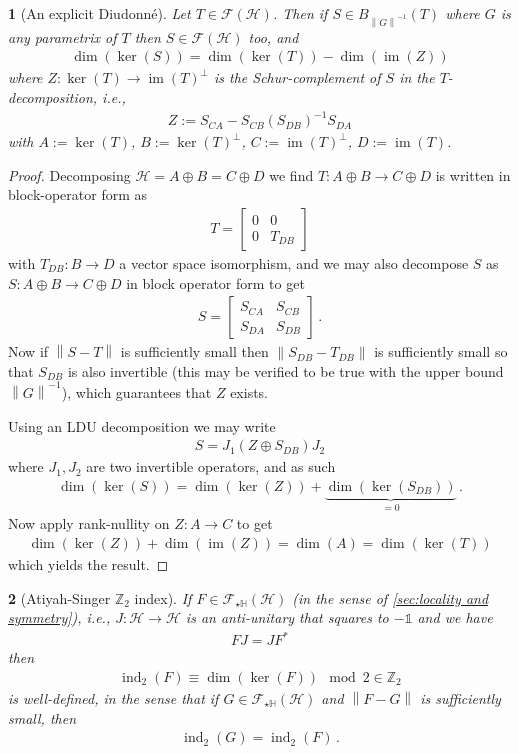 \documentclass[a4paper,10pt]{article}
\numberwithin{equation}{section}
\theoremstyle{plain}
\newtheorem{thm}{\protect\theoremname}[section]
\theoremstyle{plain}
\newtheorem{lem}[thm]{\protect\lemmaname}
\theoremstyle{plain}
\theoremstyle{plain}
\theoremstyle{plain}
\theoremstyle{remark}
\theoremstyle{definition}
\theoremstyle{plain}
\providecommand{\lemmaname}{Lemma}
\providecommand{\theoremname}{Theorem}
\newcommand{\ZZ}{\mathbb{Z}}
\newcommand{\calF}{\mathcal{F}}
\newcommand{\calH}{\mathcal{H}}
\newcommand\norm[1]{\left\lVert#1\right\rVert}
\newcommand{\Id}{\mathds{1}}
\newcommand{\HH}{\mathbb{H}}
\newcommand{\findex}{\operatorname{ind}}
\newcommand{\im}{\operatorname{im}}
\newcommand{\eq}[1]{\begin{align*}#1\end{align*}}
\newcommand{\Schur}{Z}
\begin{document}
	\begin{lem}[An explicit Diudonn\'e]\label{lem:strengthening of Diudonne}
		Let $T\in\mathcal{F}\left(\mathcal{H}\right)$. Then if $S\in B_{\norm{G}^{-1}}\left(T\right)$
		where $G$ is any parametrix of $T$ then $S\in\mathcal{F}\left(\mathcal{H}\right)$
		too, and 
		\eq{
			\dim\left(\ker\left(S\right)\right)=\dim\left(\ker\left(T\right)\right)-\dim\left(\im\left(\Schur\right)\right)
		}
		where $\Schur:\ker\left(T\right)\to\im\left(T\right)^{\perp}$
		is the Schur-complement of $S$ in the $T$-decomposition, i.e., 
		\eq{
			\Schur:=S_{CA}-S_{CB}\left(S_{DB}\right)^{-1}S_{DA}
		}
		with $A:=\ker\left(T\right)$, $B:=\ker\left(T\right)^{\perp}$, $C:=\im\left(T\right)^{\perp}$,
		$D:=\im\left(T\right)$.
	\end{lem}
	
	\begin{proof}
		Decomposing $\mathcal{H}= A\oplus B= C\oplus D$ we find $T:A\oplus B\to C\oplus D$
		is written in block-operator form as 
		\eq{
			T=\begin{bmatrix}0 & 0\\
				0 & T_{DB}
			\end{bmatrix}
		}
		with $T_{DB}:B\to D$ a vector space isomorphism, and we may also
		decompose $S$ as $S:A\oplus B\to C\oplus D$ in block operator form
		to get 
		\eq{
			S = \begin{bmatrix}S_{CA} & S_{CB}\\
				S_{DA} & S_{DB}
			\end{bmatrix}\,.
		}
		Now if $\norm{S-T}$ is sufficiently small then $\norm{S_{DB}-T_{DB}}$
		is sufficiently small so that $S_{DB}$ is also invertible (this may
		be verified to be true with the upper bound $\norm{G}^{-1}$), which guarantees that $\Schur$ exists. 
		
		Using an LDU decomposition we may write 
		\eq{
			S=J_{1}\left(\Schur\oplus S_{DB}\right)J_{2}
		}
		where $J_{1},J_{2}$ are two invertible operators, and as such 
		\eq{
			\dim\left(\ker\left(S\right)\right)  =  \dim\left(\ker\left(\Schur\right)\right)+\underbrace{\dim\left(\ker\left(S_{DB}\right)\right)}_{=0}\,.
		}
		Now apply rank-nullity on $\Schur:A\to C$ to get 
		\eq{
			\dim\left(\ker\left(\Schur\right)\right)+\dim\left(\im\left(\Schur\right)\right)  =  \dim\left(A\right)=\dim\left(\ker\left(T\right)\right)
		}
		which yields the result.
	\end{proof}
	
	
	\begin{thm}[Atiyah-Singer $\ZZ_2$ index]\label{thm:ASZ2 index}
		If $F\in\calF_{\star\HH}\left(\mathcal{H}\right)$ (in the sense of \cref{sec:locality and symmetry}), i.e., $J:\calH\to\calH$ is an anti-unitary that squares to $-\Id$ and we have
		\eq{
			FJ=J F^{\ast}
		}
		then 
		\eq{
			\findex_{2}\left(F\right)\equiv\dim\left(\ker\left(F\right)\right)\mod2\in\mathbb{Z}_{2}
		}
		is well-defined, in the sense that if $G\in\calF_{\star\HH}\left(\mathcal{H}\right)$
		and $\norm{F-G}$ is sufficiently small, then
		\eq{
			\findex_{2}\left(G\right) = \findex_{2}\left(F\right)\,.
		}
	\end{thm}
	
\end{document}
